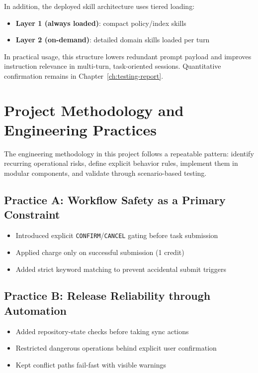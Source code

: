 In addition, the deployed skill architecture uses tiered loading:
\begin{itemize}
    \item \textbf{Layer 1 (always loaded)}: compact policy/index skills
    \item \textbf{Layer 2 (on-demand)}: detailed domain skills loaded per turn
\end{itemize}

In practical usage, this structure lowers redundant prompt payload and improves instruction relevance in multi-turn, task-oriented sessions. Quantitative confirmation remains in Chapter~\ref{ch:testing-report}.

\section{Project Methodology and Engineering Practices}
\label{sec:optimization-practices}

The engineering methodology in this project follows a repeatable pattern:
identify recurring operational risks, define explicit behavior rules, implement them in modular components, and validate through scenario-based testing.

\subsection{Practice A: Workflow Safety as a Primary Constraint}
\begin{itemize}
	\item Introduced explicit \texttt{CONFIRM}/\texttt{CANCEL} gating before task submission
	\item Applied charge only on successful submission (1 credit)
	\item Added strict keyword matching to prevent accidental submit triggers
\end{itemize}

\subsection{Practice B: Release Reliability through Automation}
\begin{itemize}
	\item Added repository-state checks before taking sync actions
	\item Restricted dangerous operations behind explicit user confirmation
	\item Kept conflict paths fail-fast with visible warnings
\end{itemize}

